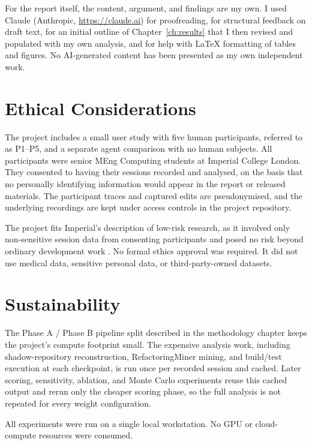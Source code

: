 For the report itself, the content, argument, and findings are my own. I used Claude (Anthropic, \url{https://claude.ai}) for proofreading, for structural feedback on draft text, for an initial outline of Chapter~\ref{ch:results} that I then revised and populated with my own analysis, and for help with \LaTeX{} formatting of tables and figures. No AI-generated content has been presented as my own independent work.

\section{Ethical Considerations}
\label{sec:declarations-ethics}

The project includes a small user study with five human participants, referred to as P1--P5, and a separate agent comparison with no human subjects. All participants were senior MEng Computing students at Imperial College London. They consented to having their sessions recorded and analysed, on the basis that no personally identifying information would appear in the report or released materials. The participant traces and captured edits are pseudonymised, and the underlying recordings are kept under access controls in the project repository.

The project fits Imperial's description of low-risk research, as it involved only non-sensitive session data from consenting participants and posed no risk beyond ordinary development work \cite{imperial_research_ethics}. No formal ethics approval was required. It did not use medical data, sensitive personal data, or third-party-owned datasets.

\section{Sustainability}
\label{sec:declarations-sustainability}

The Phase A / Phase B pipeline split described in the methodology chapter keeps the project's compute footprint small. The expensive analysis work, including shadow-repository reconstruction, RefactoringMiner mining, and build/test execution at each checkpoint, is run once per recorded session and cached. Later scoring, sensitivity, ablation, and Monte Carlo experiments reuse this cached output and rerun only the cheaper scoring phase, so the full analysis is not repeated for every weight configuration.

All experiments were run on a single local workstation. No GPU or cloud-compute resources were consumed.

